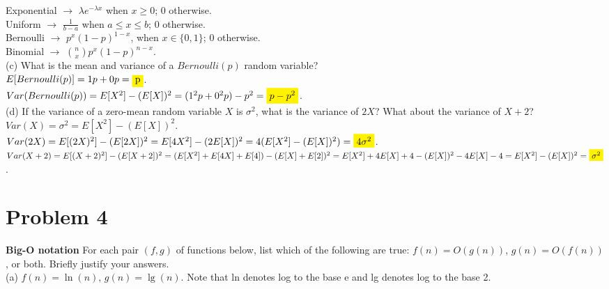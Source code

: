 \documentclass[12pt]{article}
\begin{document}
Exponential $\rightarrow$ $\lambda e^{-\lambda x}$ when $x \geq 0$; $0$ otherwise.\\

Uniform $\rightarrow$ $\frac{1}{b-a}$ when $a \leq x \leq b$; 0 otherwise.\\

Bernoulli $\rightarrow$ $p^x(1 -p)^{1-x}$, when $x \in \{0, 1\}$; 0 otherwise.\\

Binomial $\rightarrow$ ${n \choose x} p^x (1 - p)^{n - x}$.\\


\noindent(c) What is the mean and variance of a $Bernoulli(p)$ random variable?\\

$E[Bernoulli(p)] = 1 p + 0 p = \colorbox{yellow}{p}$. \\

$Var(Bernoulli(p)) = E[X^2] - (E[X])^2 = (1^2 p + 0^2p) - p^2 = \colorbox{yellow}{$p - p^2$}$.\\

\noindent(d) If the variance of a zero-mean random variable $X$ is $\sigma^2$, what is the variance of $2X$? What about the variance of $X + 2$?\\

$Var(X) = \sigma^2 = E[X^2] - (E[X])^2$.\\

$Var(2X) = E[(2X)^2] - (E[2X])^2 =E[4X^2] - (2E[X])^2 = 4(E[X^2] - (E[X])^2) = \colorbox{yellow}{$4\sigma^2$}$.\\

$Var(X + 2) = E[(X + 2)^2] - (E[X + 2])^2 = (E[X^2] + E[4X] + E[4]) - (E[X] + E[2])^2 = E[X^2] + 4E[X] + 4 - (E[X])^2 - 4E[X] - 4 = E[X^2] - (E[X])^2 = \colorbox{yellow}{$\sigma^2$}$.\\

\section*{Problem 4}

\textbf{Big-O notation} For each pair $(f,g)$ of functions below, list which of the following are true:
$f(n) = O(g(n))$, $g(n) = O(f(n))$, or both. Briefly justify your answers.\\

\noindent(a) $f(n) = \ln(n)$, $g(n) = \lg(n)$. Note that ln denotes log to the base e and lg denotes log to the base 2.\\
\end{document}
